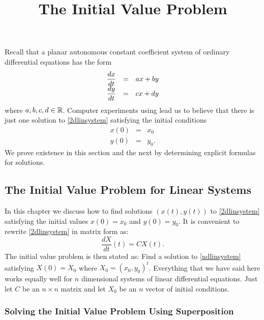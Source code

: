 \documentclass{ximera}
\title{The Initial Value Problem}
\begin{document}
\begin{abstract}
\end{abstract}
\maketitle

\label{S:6.1}

Recall that a planar autonomous  constant coefficient system of
ordinary differential equations has the form
\arraystart
\begin{equation}  \label{2dlinsystem}
\begin{array}{ccl}
\displaystyle \frac{dx}{dt}  & = & ax+by \\
\displaystyle \frac{dy}{dt}  & = & cx+dy
\end{array}
\end{equation}
\arrayfinish
where $a,b,c,d\in\mbox{$\Bbb{R}$}$. Computer experiments using {\pplane} lead us to
believe that there is just one solution to \eqref{2dlinsystem} satisfying
the initial conditions
\begin{eqnarray*}
x(0) & = & x_0 \\
y(0) & = & y_0.
\end{eqnarray*}
We prove existence in this section and the next by determining explicit 
formulas for solutions.  

\subsection*{The Initial Value Problem for Linear Systems}

In this chapter we discuss how to find solutions $(x(t),y(t))$ to
\eqref{2dlinsystem} satisfying the initial values $x(0)=x_0$ and $y(0)=y_0$.
It is convenient to rewrite \eqref{2dlinsystem} in matrix form as:
\begin{equation} \label{ndlinsystem}
\frac{dX}{dt}(t) = CX(t).
\end{equation}
The initial value problem is then stated as:  Find a solution to
\eqref{ndlinsystem} satisfying $X(0)=X_0$ where $X_0=(x_0,y_0)^t$.
Everything that we have said here works equally well for $n$
dimensional systems of linear differential equations.  Just let
$C$ be an $n\times n$ matrix and let $X_0$ be an $n$ vector
of initial conditions.

\subsubsection*{Solving the Initial Value Problem Using Superposition}
\end{document}
